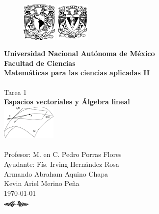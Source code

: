 \documentclass[letterpaper]{article}
\renewcommand{\*}{\cdot}
\theoremstyle{definition}
\begin{document}
		\begin{titlepage}
		\begin{center}
			\begin{figure}[h]
				\includegraphics*[width=0.15\textwidth]{unam}
				\centering
				\hspace{0.6cm}
				\includegraphics*[width=0.15\textwidth]{ciencias}
				\centering
			\end{figure}
			\Large{\textbf{Universidad Nacional Autónoma de México}} \\[0.5cm]
			\Large{\textbf{Facultad de Ciencias}} \\[0.5cm]
			\Large{\textbf{Matemáticas para las ciencias aplicadas II}} \\[0.5cm]
			\hrulefill \\[2cm]
			\Huge{Tarea 1}\\
			\Huge{\textbf{Espacios vectoriales y Álgebra lineal}}\\ [1cm]
			\includegraphics*[width=0.2\textwidth]{space}\\[1.5cm]
			\hrulefill \\[1.5cm]
			\large{Profesor: M. en C. Pedro Porras Flores}\\
			\large{Ayudante: Fís. Irving Hernández Rosa }\\
			\large{Armando Abraham Aquino Chapa}\\
			\large{Kevin Ariel Merino Peña}
			\\[1cm]
			\today\\ [0.3cm]
			\includegraphics[width=0.1\textwidth]{ornamental}
		\end{center}
	\end{titlepage}
\end{document}
